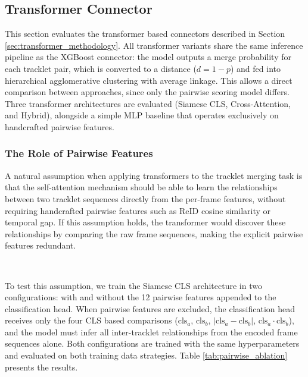 \subsection{Transformer Connector}\label{sec:transformer_experiments}
This section evaluates the transformer based connectors described in Section \ref{sec:transformer_methodology}. All transformer variants share the same inference pipeline as the XGBoost connector: the model outputs a merge probability for each tracklet pair, which is converted to a distance ($d=1-p$) and fed into hierarchical agglomerative clustering with average linkage. This allows a direct comparison between approaches, since only the pairwise scoring model differs. Three transformer architectures are evaluated (Siamese CLS, Cross-Attention, and Hybrid), alongside a simple MLP baseline that operates exclusively on handcrafted pairwise features.


\subsubsection{The Role of Pairwise Features}\label{sec:pairwise_ablation}
A natural assumption when applying transformers to the tracklet merging task is that the self-attention mechanism should be able to learn the relationships between two tracklet sequences directly from the per-frame features, without requiring handcrafted pairwise features such as ReID cosine similarity or temporal gap. If this assumption holds, the transformer would discover these relationships by comparing the raw frame sequences, making the explicit pairwise features redundant.

\

To test this assumption, we train the Siamese CLS architecture in two configurations: with and without the 12 pairwise features appended to the classification head. When pairwise features are excluded, the classification head receives only the four CLS based comparisons ($\text{cls}_a$, $\text{cls}_b$, $|\text{cls}_a - \text{cls}_b|$, $\text{cls}_a \cdot \text{cls}_b$), and the model must infer all inter-tracklet relationships from the encoded frame sequences alone. Both configurations are trained with the same hyperparameters and evaluated on both training data strategies. Table \ref{tab:pairwise_ablation} presents the results.


